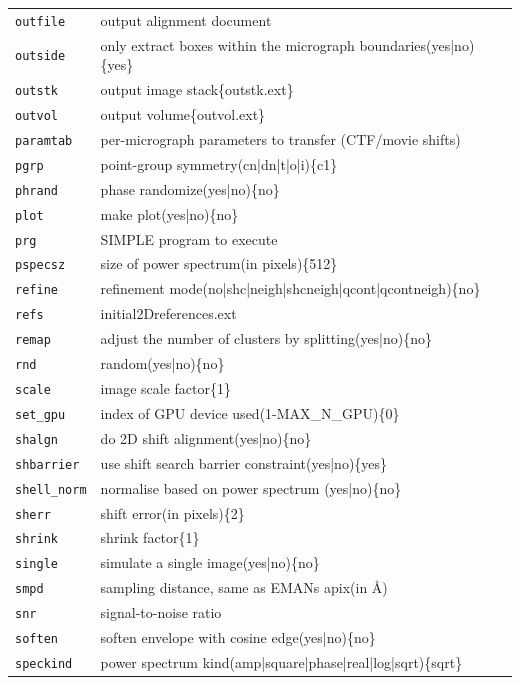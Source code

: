 \documentclass[a4paper,11pt]{article}
\begin{document}
\begin{tabular}{ll}
\texttt{outfile}&{output alignment document}\\
\texttt{outside}&{only extract boxes within the micrograph boundaries(yes|no)\{yes\}}\\
\texttt{outstk}&{output image stack\{outstk.ext\}}\\
\texttt{outvol}&{output volume\{outvol.ext\}}\\
\texttt{paramtab}&{per-micrograph parameters to transfer (CTF/movie shifts)}\\
\texttt{pgrp}&{point-group symmetry(cn|dn|t|o|i)\{c1\}}\\
\texttt{phrand}&{phase randomize(yes|no)\{no\}}\\
\texttt{plot}&{make plot(yes|no)\{no\}}\\
\texttt{prg}&{SIMPLE program to execute}\\
\texttt{pspecsz}&{size of power spectrum(in pixels)\{512\}}\\
\texttt{refine}&{refinement mode(no|shc|neigh|shcneigh|qcont|qcontneigh)\{no\}}\\
\texttt{refs}&{initial2Dreferences.ext}\\
\texttt{remap}&{adjust the number of clusters by splitting(yes|no)\{no\}}\\
\texttt{rnd}&{random(yes|no)\{no\}}\\
\texttt{scale}&{image scale factor\{1\}}\\
\texttt{set\_gpu}&{index of GPU device used(1-MAX\_N\_GPU)\{0\}}\\
\texttt{shalgn}&{do 2D shift alignment(yes|no)\{no\}}\\
\texttt{shbarrier}&{use shift search barrier constraint(yes|no)\{yes\}}\\
\texttt{shell\_norm}&{normalise based on power spectrum (yes|no)\{no\}}\\
\texttt{sherr}&{shift error(in pixels)\{2\}}\\
\texttt{shrink}&{shrink factor\{1\}}\\
\texttt{single}&{simulate a single image(yes|no)\{no\}}\\
\texttt{smpd}&{sampling distance, same as EMANs apix(in \AA{})}\\
\texttt{snr}&{signal-to-noise ratio}\\
\texttt{soften}&{soften envelope with cosine edge(yes|no)\{no\}}\\
\texttt{speckind}&{power spectrum kind(amp|square|phase|real|log|sqrt)\{sqrt\}}\\

\end{tabular}
\end{document}
